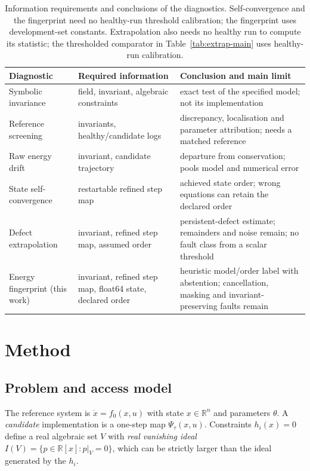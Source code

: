\documentclass[10pt]{article}
\theoremstyle{definition}
\begin{document}
\begin{table}[htbp]
\centering\small
\begin{tabular}{>{\raggedright\arraybackslash}p{3.1cm}>{\raggedright\arraybackslash}p{4.6cm}>{\raggedright\arraybackslash}p{6.4cm}}
\toprule
Diagnostic & Required information & Conclusion and main limit \\
\midrule
Symbolic invariance & field, invariant, algebraic constraints & exact test of the specified model; not its implementation \\
Reference screening & invariants, healthy/candidate logs & discrepancy, localisation and parameter attribution; needs a matched reference \\
Raw energy drift & invariant, candidate trajectory & departure from conservation; pools model and numerical error \\
State self-convergence & restartable refined step map & achieved state order; wrong equations can retain the declared order \\
Defect extrapolation & invariant, refined step map, assumed order & persistent-defect estimate; remainders and noise remain; no fault class from a scalar threshold \\
Energy fingerprint (this work) & invariant, refined step map, float64 state, declared order & heuristic model/order label with abstention; cancellation, masking and invariant-preserving faults remain \\
\bottomrule
\end{tabular}
\caption{Information requirements and conclusions of the diagnostics.
Self-convergence and the fingerprint need no healthy-run threshold calibration;
the fingerprint uses development-set constants. Extrapolation also needs no
healthy run to compute its statistic; the thresholded comparator in
Table~\ref{tab:extrap-main} uses healthy-run calibration.}
\label{tab:capabilities}
\end{table}

\section{Method}\label{sec:method}

\subsection{Problem and access model}\label{sec:setting}

The reference system is $\dot x=f_0(x,u)$ with state $x\in\mathbb R^n$ and
parameters $\theta$. A \emph{candidate} implementation is a one-step map
$\Psi_\tau(x,u)$. Constraints $h_i(x)=0$ define a real algebraic set $V$
with \emph{real vanishing ideal}
$I(V)=\{p\in\mathbb R[x]: p|_V=0\}$, which can be strictly larger than the
ideal generated by the $h_i$.
\end{document}
